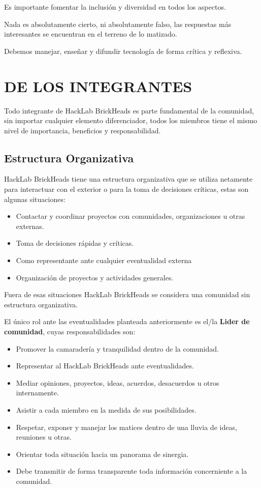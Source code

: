 \documentclass[12pt, letterpaper]{article}
\begin{document}
    Es importante fomentar la inclusión y diversidad en todos los aspectos.

    Nada es absolutamente cierto, ni absolutamente falso, las respuestas más
    interesantes se encuentran en el terreno de lo matizado.

    Debemos manejar, enseñar y difundir tecnología de forma crítica y reflexiva.

    \section{DE LOS INTEGRANTES}
    Todo integrante de HackLab BrickHeads es parte fundamental de la 
    comunidad, sin importar cualquier elemento diferenciador, todos los miembros 
    tiene el mismo nivel de importancia, beneficios y responsabilidad.

    \subsection{Estructura Organizativa}
    HackLab BrickHeads tiene una estructura organizativa que se 
    utiliza netamente para interactuar con el exterior o para la toma de 
    decisiones críticas, estas son algunas situaciones:

    \begin{itemize}
        \item Contactar y coordinar proyectos con comunidades, organizaciones u 
        otras externas.
        \item Toma de decisiones rápidas y críticas.
        \item Como representante ante cualquier eventualidad externa
        \item Organización de proyectos y actividades generales.
    \end{itemize}

    Fuera de esas situaciones HackLab BrickHeads se considera una comunidad 
    sin estructura organizativa.

    El único rol ante las eventualidades planteada anteriormente es el/la
    \textbf{Lider de comunidad}, cuyas responsabilidades son:
    \begin{itemize}
        \item Promover la camaradería y tranquilidad dentro de la comunidad.
        \item Representar al HackLab BrickHeads ante eventualidades.
        \item Mediar opiniones, proyectos, ideas, acuerdos, desacuerdos u otros 
        internamente. 
        \item Asistir a cada miembro en la medida de sus posibilidades.
        \item Respetar, exponer y manejar los matices dentro de una lluvia de
        ideas, reuniones u otras.
        \item Orientar toda situación hacia un panorama de sinergia.
        \item Debe transmitir de forma transparente toda información concerniente 
        a la comunidad.
    \end{itemize}
\end{document}
